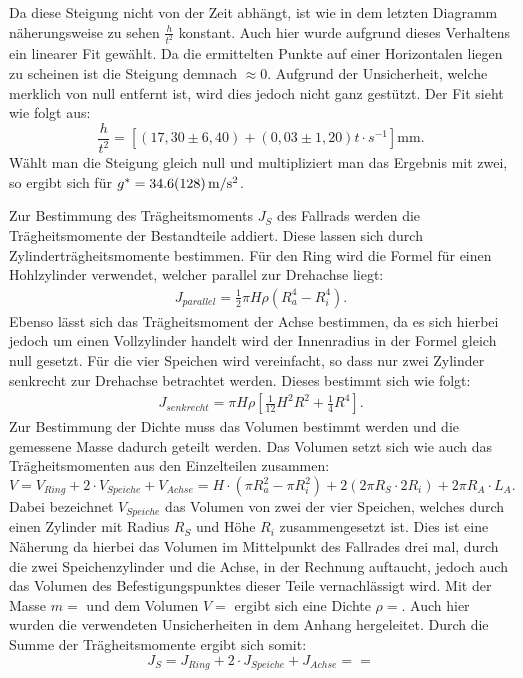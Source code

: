 			Da diese Steigung nicht von der Zeit abhängt, ist wie in dem letzten Diagramm näherungsweise zu sehen $\frac{h}{t^2}$ konstant. Auch hier wurde aufgrund dieses Verhaltens ein linearer Fit gewählt. Da die ermittelten Punkte auf einer Horizontalen liegen zu scheinen ist die Steigung demnach $\approx 0$. Aufgrund der Unsicherheit, welche merklich von null entfernt ist, wird dies jedoch nicht ganz gestützt. Der Fit sieht wie folgt aus:
			\begin{equation*}
				\frac{h}{t^2} = [(17,30 \pm 6,40) + (0,03 \pm 1,20)t\cdot\si{s^{-1}}]\si{\mm}.
			\end{equation*} 
			Wählt man die Steigung gleich null und multipliziert man das Ergebnis mit zwei, so ergibt sich für $g^{*} = \SI{34,6+-12,8}{\m\per\s^2}$. 
					
			Zur Bestimmung des Trägheitsmoments $J_S$ des Fallrads werden die Trägheitsmomente der Bestandteile addiert. Diese lassen sich durch Zylinderträgheitsmomente bestimmen. Für den Ring wird die Formel für einen Hohlzylinder verwendet, welcher parallel zur Drehachse liegt:
			\begin{align}
					J_{parallel} = \frac{1}{2}\pi H\rho(R_a^4-R_i^4). \label{eq:Trägpar}
			\end{align}
			Ebenso lässt sich das Trägheitsmoment der Achse bestimmen, da es sich hierbei jedoch um einen Vollzylinder handelt wird der Innenradius in der Formel gleich null gesetzt.
			Für die vier Speichen wird vereinfacht, so dass nur zwei Zylinder senkrecht zur Drehachse betrachtet werden.
			Dieses bestimmt sich wie folgt: 
			\begin{align}
				J_{senkrecht} = \pi H\rho\left[\frac{1}{12}H^2R^2+\frac{1}{4}R^4\right]. \label{eq:Trägsenk}
			\end{align} 
			Zur Bestimmung der Dichte muss das Volumen bestimmt werden und die gemessene Masse dadurch geteilt werden. Das Volumen setzt sich wie auch das Trägheitsmomenten aus den Einzelteilen zusammen:
			\begin{equation}
				V = V_{Ring} + 2\cdot V_{Speiche} + V_{Achse} = H\cdot(\pi R_a^2 - \pi R_i^2) + 2(2\pi R_S\cdot 2 R_i) + 2\pi R_A\cdot L_A.
			\end{equation}
			Dabei bezeichnet $V_{Speiche}$ das Volumen von zwei der vier Speichen, welches durch einen Zylinder mit Radius $R_S$ und Höhe $R_i$ zusammengesetzt ist. Dies ist eine Näherung da hierbei das Volumen im Mittelpunkt des Fallrades drei mal, durch die zwei Speichenzylinder und die Achse, in der Rechnung auftaucht, jedoch auch das Volumen des Befestigungspunktes dieser Teile vernachlässigt wird.
			Mit der Masse $m=$ und dem Volumen $V=$ ergibt sich eine Dichte $\rho = $. Auch hier wurden die verwendeten Unsicherheiten in dem Anhang hergeleitet.
			Durch die Summe der Trägheitsmomente ergibt sich somit:
			\begin{equation}
				J_S = J_{Ring} + 2\cdot J_{Speiche} + J_{Achse} = = %
			\end{equation}
			
